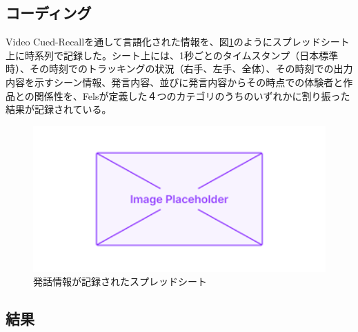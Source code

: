 \subsection{コーディング}
Video Cued-Recallを通して言語化された情報を、図\ref{fig:spreadsheet}のようにスプレッドシート上に時系列で記録した。シート上には、1秒ごとのタイムスタンプ（日本標準時）、その時刻でのトラッキングの状況（右手、左手、全体）、その時刻での出力内容を示すシーン情報、発言内容、並びに発言内容からその時点での体験者と作品との関係性を、Felsが定義した４つのカテゴリのうちのいずれかに割り振った結果が記録されている。
\begin{figure}[H]
  \centering
  \includegraphics[width=15cm]{img/placeholder.png}
  \caption{発話情報が記録されたスプレッドシート}
  \label{fig:spreadsheet}
\end{figure}

\subsection{結果}
